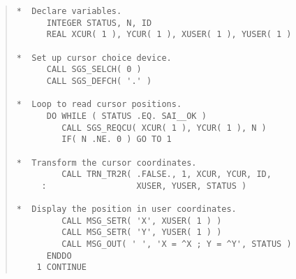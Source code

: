 \documentclass[twoside,11pt]{article}
\newcommand{\numcir}[1]{\mbox{\hspace{3ex}\fbox{#1}}}
\begin{document}
\begin{quote}
\begin{tabbing} %

\verb#*  Declare variables.                                  #\\
\verb#      INTEGER STATUS, N, ID                            #\\
\verb#      REAL XCUR( 1 ), YCUR( 1 ), XUSER( 1 ), YUSER( 1 )#\\
\verb#                                                       #\\
\verb#*  Set up cursor choice device.                        #\\
\verb#      CALL SGS_SELCH( 0 )                              #\\
\verb#      CALL SGS_DEFCH( '.' )                            #\\
\verb#                                                       #\\
\verb#*  Loop to read cursor positions.                      #\\
\verb#      DO WHILE ( STATUS .EQ. SAI__OK )                 #\\
\verb#         CALL SGS_REQCU( XCUR( 1 ), YCUR( 1 ), N )     #\numcir{1}\\
\verb#         IF( N .NE. 0 ) GO TO 1                        #\\
\verb#                                                       #\\
\verb#*  Transform the cursor coordinates.                   #\\
\verb#         CALL TRN_TR2R( .FALSE., 1, XCUR, YCUR, ID,    #\numcir{2}\\
\verb#     :                  XUSER, YUSER, STATUS )         #\\
\verb#                                                       #\\
\verb#*  Display the position in user coordinates.           #\\
\verb#         CALL MSG_SETR( 'X', XUSER( 1 ) )              #\\
\verb#         CALL MSG_SETR( 'Y', YUSER( 1 ) )              #\\
\verb#         CALL MSG_OUT( ' ', 'X = ^X ; Y = ^Y', STATUS )#\numcir{3}\\
\verb#      ENDDO                                            #\\
\verb#    1 CONTINUE                                         #\\

\end{tabbing}
\end{quote}
\end{document}
